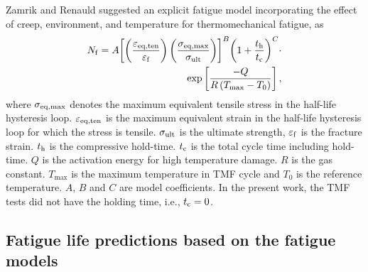 \documentclass[preprint,5p,twocolumn,11pt,sort&compress]{elsarticle}
\begin{document}
Zamrik and Renauld \cite{Zamrik2000} suggested an explicit fatigue model incorporating the effect of creep, environment, and temperature for thermomechanical fatigue, as
\begin{equation}
\begin{aligned}
{N_{\rm f}} = A{\left[ {\left( {\frac{{{\varepsilon _{\rm eq,ten}}}}{{{\varepsilon _{\rm f}}}}} \right)\left( {\frac{{{\sigma _{\rm eq,\max }}}}{{{\sigma _{\rm ult}}}}} \right)} \right]^B} 
{\left( {1 + \frac{{{t_{\rm h}}}}{{{t_{\rm c}}}}} \right)^C}\cdot \\
\exp \left[ {\frac{{ - Q}}{{R\left( {{T_{\max }} - {T_0}} \right)}}} \right],
\end{aligned}
\label{Equ:StudyModel}
\end{equation}
where $\sigma _{\rm eq,\max }$ denotes the maximum equivalent tensile stress in the half-life hysteresis loop. $\varepsilon _{\rm eq,ten}$ is the maximum equivalent strain in the half-life hysteresis loop for which the stress is tensile. $\sigma _{\rm ult}$ is the ultimate strength, $\varepsilon _{\rm f}$ is the fracture strain. $t_{\rm h}$ is the compressive hold-time. $t_{\rm c}$ is the total cycle time including hold-time. $Q$ is the activation energy for high temperature damage. $R$ is the gas constant. $T_{\max}$ is the maximum temperature in TMF cycle and $T_0$ is the reference temperature. $A$, $B$ and $C$ are model coefficients. In the present work, the TMF tests did not have the holding time, i.e., $t_{\rm c}=0$.

\subsection{Fatigue life predictions based on the fatigue models}
\end{document}
